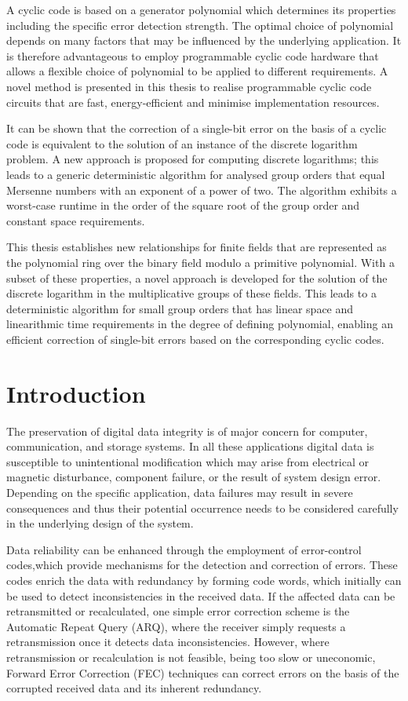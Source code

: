 \documentclass[oneside, a4paper, 11pt]{memoir}
\begin{document}
A cyclic code is based on a generator polynomial which determines its properties including the specific error detection strength. The optimal choice of polynomial depends on many factors that may be influenced by the underlying application. It is therefore advantageous to employ programmable cyclic code hardware that allows a flexible choice of polynomial to be applied to different requirements. A novel method is presented in this thesis to realise programmable cyclic code circuits that are fast, energy-efficient and minimise implementation resources.

It can be shown that the correction of a single-bit error on the basis of a cyclic code is equivalent to the solution of an instance of the discrete logarithm problem. A new approach is proposed for computing discrete logarithms; this leads to a generic deterministic algorithm for analysed group orders that equal Mersenne numbers with an exponent of a power of two. The algorithm exhibits a worst-case runtime in the order of the square root of the group order and constant space requirements.

This thesis establishes new relationships for finite fields that are represented as the polynomial ring over the binary field modulo a primitive polynomial. With a subset of these properties, a novel approach is developed for the solution of the discrete logarithm in the multiplicative groups of these fields. This leads to a deterministic algorithm for small group orders that has linear space and linearithmic time requirements in the degree of defining polynomial, enabling an efficient correction of single-bit errors based on the corresponding cyclic codes.

\section{Introduction}
The preservation of digital data integrity is of major concern for computer, communication, and storage systems. In all these applications digital data is susceptible to unintentional modification which may arise from electrical or magnetic disturbance, component failure, or the result of system design error. Depending on the specific application, data failures may result in severe consequences and thus their potential occurrence needs to be considered carefully in the underlying design of the system.

Data reliability can be enhanced through the employment of error-control codes,which provide mechanisms for the detection and correction of errors. These codes enrich the data with redundancy by forming code words, which initially can be used to detect inconsistencies in the received data. If the affected data can be retransmitted or recalculated, one simple error correction scheme is the Automatic Repeat Query (ARQ), where the receiver simply requests a retransmission once it detects data inconsistencies. However, where retransmission or recalculation is not feasible, being too slow or uneconomic, Forward Error Correction (FEC) techniques can correct errors on the basis of the corrupted received data and its inherent redundancy.
\end{document}
